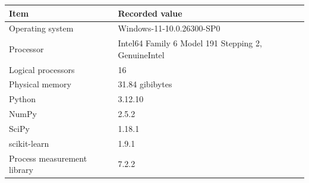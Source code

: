 \begin{tabular}{@{}ll@{}}
\toprule
Item & Recorded value \\
\midrule
Operating system & Windows-11-10.0.26300-SP0 \\
Processor & Intel64 Family 6 Model 191 Stepping 2, GenuineIntel \\
Logical processors & 16 \\
Physical memory & 31.84 gibibytes \\
Python & 3.12.10 \\
NumPy & 2.5.2 \\
SciPy & 1.18.1 \\
scikit-learn & 1.9.1 \\
Process measurement library & 7.2.2 \\
\bottomrule
\end{tabular}
